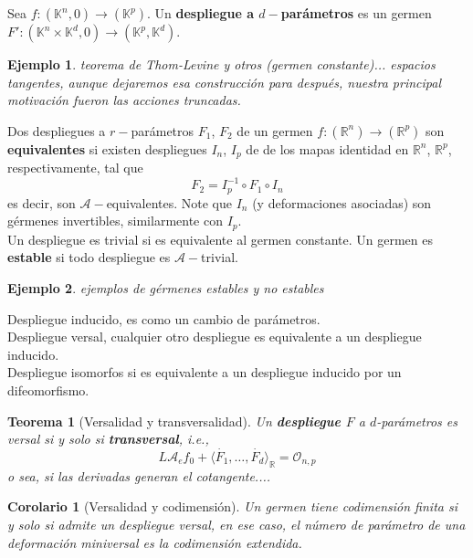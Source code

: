 \documentclass[12pt]{book}
\newtheorem{eje}{Ejemplo}
\newtheorem{teo}{Teorema}
\newtheorem{cor}{Corolario}
\newcommand{\ag}{\mathcal{A}}
\begin{document}
Sea $f: (\mathbb{K}^n, 0) \rightarrow (\mathbb{K}^p)$.
Un \textbf{despliegue a $d-$parámetros} es un germen $F':(\mathbb{K}^n \times \mathbb{K}^d, 0) \rightarrow (\mathbb{K}^p, \mathbb{K}^d)$.

\begin{eje}
	teorema de Thom-Levine y otros (germen constante)... espacios tangentes, aunque dejaremos esa construcción para después, nuestra principal motivación fueron las acciones truncadas.
\end{eje}

Dos despliegues a $r-$parámetros $F_1$, $F_2$ de un germen $f: (\mathbb{R}^n)\rightarrow (\mathbb{R}^p)$ son \textbf{equivalentes} si existen despliegues $I_n$, $I_p$ de de los mapas identidad en $\mathbb{R}^n$, $\mathbb{R}^p$, respectivamente, tal que $$ F_2 = I_p ^{-1} \circ F_1 \circ I_{n}$$
es decir, son $\ag-$equivalentes. Note que $I_n$ (y deformaciones asociadas) son gérmenes invertibles, similarmente con $I_p$.\\
Un despliegue es trivial si es equivalente al germen constante. Un germen es \textbf{estable} si todo despliegue es $\mathcal{A}-$trivial.\\




\begin{eje}
	ejemplos de gérmenes estables y no estables
\end{eje}

Despliegue inducido, es como un cambio de parámetros.\\
Despliegue versal, cualquier otro despliegue es equivalente a un despliegue inducido.\\
Despliegue isomorfos si es equivalente a un despliegue inducido por un difeomorfismo.

\begin{teo}[Versalidad y transversalidad]
Un \textbf{despliegue $F$} a $d$-parámetros es versal si y solo si \textbf{transversal}, i.e., $$ L \ag _e f_0 + \langle \stackrel{\cdot}{F}_1, \ldots , \stackrel{\cdot}{F}_d \rangle _ \mathbb{R} = \mathcal{O}_{n,p} $$
o sea, si las derivadas generan el cotangente....
\end{teo}


\begin{cor}[Versalidad y codimensión]
Un germen tiene codimensión finita si y solo si admite un despliegue versal, en ese caso, el número de parámetro de una deformación miniversal es la codimensión extendida.
\end{cor}
\end{document}
